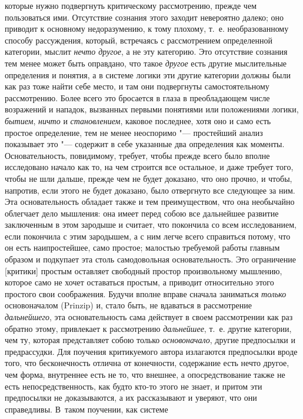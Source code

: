 которые нужно подвергнуть критическому рассмотрению, прежде чем
пользоваться ими. Отсутствие сознания этого заходит невероятно далеко; оно
приводит к основному недоразумению, к тому плохому, т.~е. необразованному
способу рассуждения, который, встречаясь с рассмотрением определенной
категории, мыслит {\em нечто другое}, а не эту
категорию. Это отсутствие сознания тем менее может быть оправдано, что
такое {\em другое} есть другие мыслительные определения
и понятия, а в системе логики эти другие категории должны были как раз тоже
найти себе место, и там они подвергнуты самостоятельному рассмотрению.
Более всего это бросается в глаза в преобладающем числе возражений и
нападок, вызванных первыми понятиями или положениями логики,
{\em бытием}, {\em ничто} и
{\em становлением}, каковое последнее, хотя оно и само
есть простое определение, тем не менее неоспоримо "--- простейший анализ
показывает это "--- содержит в себе указанные два определения как моменты.
Основательность, повидимому, требует, чтобы прежде всего было вполне
исследовано начало как то, на чем строится все остальное, и даже требует
того, чтобы не шли дальше, прежде чем не будет доказано, что оно прочно, и
чтобы, напротив, если этого не будет доказано, было отвергнуто все
следующее за ним. Эта основательность обладает также и тем преимуществом,
что она необычайно облегчает дело мышления: она имеет перед собою все
дальнейшее развитие заключенным в этом зародыше и считает, что покончила со
всем исследованием, если покончила с этим зародышем, а с ним легче всего
справиться потому, что он есть наипростейшее, само простое; малостью
требуемой работы главным образом и подкупает эта столь самодовольная
основательность. Это ограничение [критики] простым оставляет свободный
простор произвольному мышлению, которое само не хочет оставаться простым, а
приводит относительно этого простого свои соображения. Будучи вполне вправе
сначала заниматься {\em только} основоначалом (Prinzip)
и, стало быть, не вдаваться в рассмотрение
{\em дальнейшего}, эта основательность сама действует в
своем рассмотрении как раз обратно этому, привлекает к рассмотрению
{\em дальнейшее}, т.~е. другие категории, чем ту,
которая представляет собою только {\em основоначало},
другие предпосылки и предрассудки. Для поучения критикуемого автора
излагаются предпосылки вроде того, что бесконечность отлична от конечности,
содержание есть нечто другое, чем форма, внутреннее есть не то, что
внешнее, а опосредствование также не есть непосредственность, как будто
кто-то этого не знает, и притом эти предпосылки не доказываются, а их
рассказывают и уверяют, что они справедливы. В~таком поучении, как системе
